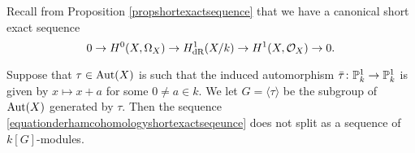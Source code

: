 
    Recall from Proposition \ref{propshortexactsequence} that we have a canonical short exact sequence
        \begin{equation}\label{equationderhamcohomologyshortexactseqeunce}
        0 \rightarrow {H^0(X,\Omega_X)} \rightarrow H_{\text {dR}}^1(X/k) \rightarrow H^1(X,\mathcal{O}_X) \rightarrow 0.
        \end{equation}
        
    \begin{thm}\label{theoremsplittingtheorem}
    Suppose that $\tau \in \operatorname{Aut}(X)$ is such that the induced automorphism $\bar \tau \colon \mathbb P_k^1 \rightarrow \mathbb P_k^1$ is given by $x \mapsto x+a$ for some $0 \neq a \in k$.
    We let $G = \langle \tau \rangle$ be the subgroup of $\operatorname{Aut}(X)$ generated by $\tau$.
    Then the sequence \eqref{equationderhamcohomologyshortexactseqeunce} does not split as a sequence of $k[G]$-modules.
    \end{thm}
